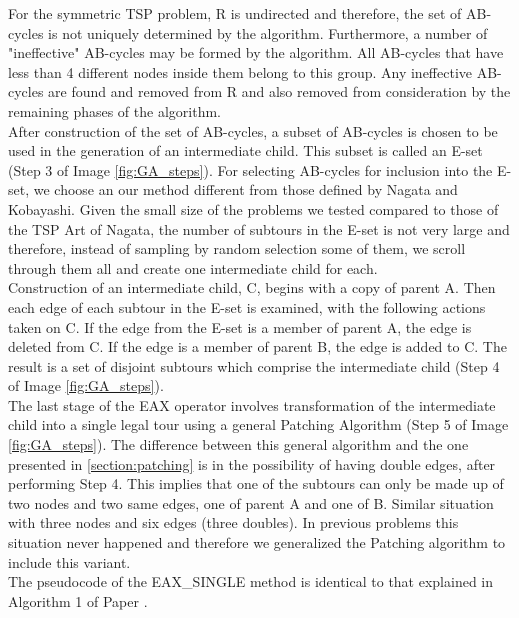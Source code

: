 For the symmetric TSP problem, R is undirected and therefore, the set of AB-cycles is not uniquely determined by the algorithm. Furthermore, a number of "ineffective" AB-cycles may be formed by the algorithm. All AB-cycles that have less than 4 different nodes inside them belong to this group. Any ineffective AB-cycles are found and removed from R and also removed from consideration by the remaining phases of the algorithm.
\\
After construction of the set of AB-cycles, a subset of AB-cycles is chosen to be used in the generation of an intermediate child. This subset is called an E-set (Step 3 of Image \ref{fig:GA_steps}). For selecting AB-cycles for inclusion into the E-set, we choose an our method different from those defined by Nagata and Kobayashi. Given the small size of the problems we tested compared to those of the TSP Art of Nagata, the number of subtours in the E-set is not very large and therefore, instead of sampling by random selection some of them, we scroll through them all and create one intermediate child for each.
\\
Construction of an intermediate child, C, begins with a copy of parent A. Then each edge of each subtour in the E-set is examined, with the following actions taken on C. If the edge from the E-set is a member of parent A, the edge is deleted from C. If the edge is a member of parent B, the edge is added to C. The result is a set of disjoint subtours which comprise the intermediate child (Step 4 of Image \ref{fig:GA_steps}). \\
The last stage of the EAX operator involves transformation of the intermediate child into a single legal tour using a general Patching Algorithm (Step 5 of Image \ref{fig:GA_steps}). The difference between this general algorithm and the one presented in \ref{section:patching} is in the possibility of having double edges, after performing Step 4. This implies that one of the subtours can only be made up of two nodes and two same edges, one of parent A and one of B. Similar situation with three nodes and six edges (three doubles). In previous problems this situation never happened and therefore we generalized the Patching algorithm to include this variant.\\ 
The pseudocode of the EAX\_SINGLE method is identical to that explained in Algorithm 1 of Paper \cite{Honda2013}.

